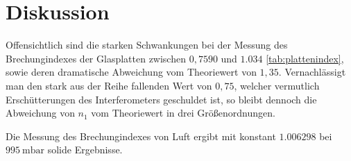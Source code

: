 \section{Diskussion}
Offensichtlich sind die starken Schwankungen bei der Messung des Brechungindexes der Glasplatten zwischen $0,7590$ und $1.034$ \ref{tab:plattenindex}, sowie deren dramatische Abweichung vom Theoriewert von $1,35$. Vernachlässigt man den stark aus der Reihe fallenden Wert von $0,75$, welcher vermutlich Erschütterungen des Interferometers geschuldet ist, so bleibt dennoch die Abweichung von $n_1$ vom Theoriewert in drei Größenordnungen.

Die Messung des Brechungindexes von Luft ergibt mit konstant $1.006298$ bei $\SI{995}{\milli\bar}$ solide Ergebnisse.



